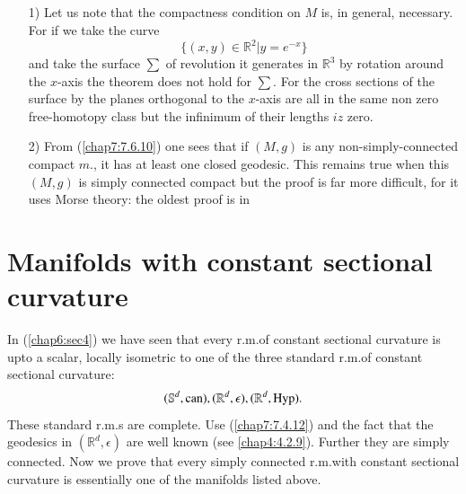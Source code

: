 \setcounter{subsection}{10}

\subsection{}\label{chap7:7.6.11}

\begin{remarks*}
\begin{itemize}
\item[1)] Let us note that the compactness condition on $M$ is, in
  general, necessary. For if we take the curve
$$
\{(x,y)\in\mathbb{R}^{2}|y=e^{-x}\}
$$
and take the surface $\sum$ of revolution it generates in
$\mathbb{R}^{3}$ by rotation around the $x$-axis the theorem does not
hold for $\sum$. For the cross sections of the surface by the planes
orthogonal to the $x$-axis are all in the same non zero free-homotopy
class but the infinimum of their lengths $iz$ zero.

\item[2)] From (\ref{chap7:7.6.10}) one sees that if $(M,g)$ is any
  non-simply-connected compact $m$., it has at least one closed
  geodesic. This remains true when this $(M,g)$ is simply connected
  compact but the proof is far more difficult, for it uses Morse
  theory: the oldest proof is in \cite{11} 
\end{itemize}
\end{remarks*}


\section{Manifolds with constant sectional
  curvature}\label{chap7:sec7}\pageoriginale

In (\ref{chap6:sec4}) we have seen that every r.m.\@ of constant sectional
curvature is upto a scalar, locally isometric to one of the three
standard r.m.\@ of constant sectional curvature:
$$
(\mathbb{S}^{d},\operatorname{can}),(\mathbb{R}^{d},\epsilon),(\mathbb{R}^{d},\operatorname{Hyp}).
$$
These standard r.m.s are complete. Use (\ref{chap7:7.4.12}) and the fact
that the geodesics in $(\mathbb{R}^{d},\epsilon)$ are well known (see
\eqref{chap4:4.2.9}). Further they are simply connected. Now we prove that
every simply connected r.m.\@ with constant sectional curvature is
essentially one of the manifolds listed above.

\subsection{}\label{chap7:7.7.1}

